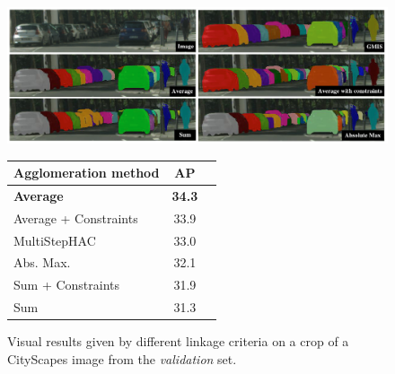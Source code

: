 \captionsetup[subtable]{labelformat=simple, labelsep=space, justification=centering, singlelinecheck=off}
\renewcommand*{\thesubtable}{(\alph{subtable})}
\begin{figure}[t]
\begin{minipage}{0.65 \textwidth}
\centering
\includegraphics[width=\textwidth]{./figs/cityscapes_compare_6.pdf} %
\caption{Visual results given by different \algname{} linkage criteria on a crop of a CityScapes image from the \emph{validation} set.}\label{fig:cityscapes}
\end{minipage}\hfill
\begin{minipage}{0.3 \textwidth}
    \centering
    \small
        \begin{tabular}[t]{l|cc}
             Agglomeration method & AP \\ \midrule
              \textbf{\algname{} Average}& \textbf{34.3} \\
              \algname{} Average + Constraints & 33.9 \\
             MultiStepHAC \cite{liu2018affinity} & 33.0 \\
              \algname{} Abs. Max. \cite{wolf2018mutex}  & 32.1 \\
              \algname{} Sum + Constraints  \cite{levinkov2017comparative} & 31.9  \\
              \algname{} Sum \cite{keuper2015efficient} & 31.3 \\
        \end{tabular}
    \vspace*{0.6em}
    \label{tab:results_cityscapes_val}
\end{minipage}
\end{figure}

